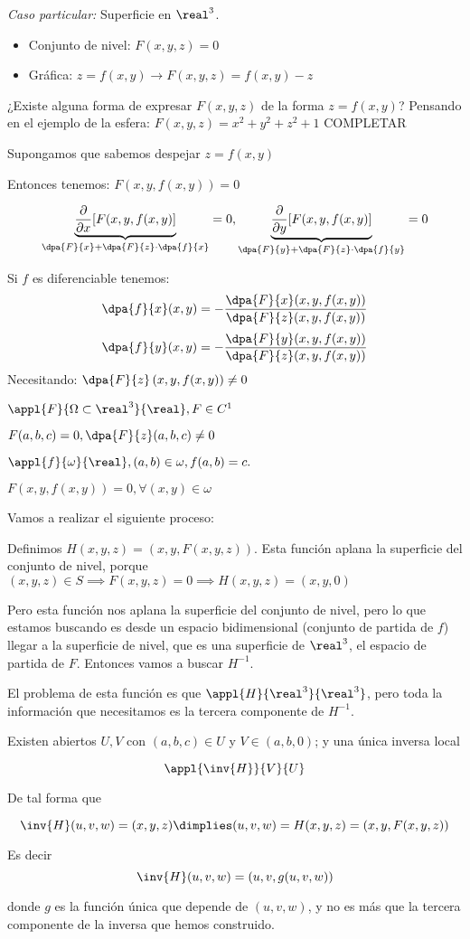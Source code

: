 \documentclass{apuntes}
\begin{document}
\emph{Caso particular:} Superficie en $\real^3$.
\begin{itemize}
 \item Conjunto de nivel: $F(x,y,z) = 0$
 \item Gráfica: $z=f(x,y) \rightarrow F(x,y,z) = f(x,y)-z$
\end{itemize}
¿Existe alguna forma de expresar $F(x,y,z)$ de la forma $z=f(x,y)$? Pensando en el ejemplo de la esfera: $F(x,y,z) = x^2+y^2+z^2+1$
COMPLETAR

Supongamos que sabemos despejar $z=f(x,y)$

Entonces tenemos: $F(x,y,f(x,y)) = 0$

$$\underbrace{\frac{\partial}{\partial x} [F(x,y,f(x,y)]}_{\dpa{F}{x} + \dpa{F}{z}\cdot\dpa{f}{x}}=0, \underbrace{\frac{\partial}{\partial y} [F(x,y,f(x,y)]}_{\dpa{F}{y} + \dpa{F}{z}\cdot\dpa{f}{y}} = 0$$

Si $f$ es diferenciable tenemos:
$$\dpa{f}{x}(x,y) = - \frac{\dpa{F}{x}(x,y,f(x,y))}{\dpa{F}{z}(x,y,f(x,y))}$$
$$\dpa{f}{y}(x,y) = - \frac{\dpa{F}{y}(x,y,f(x,y))}{\dpa{F}{z}(x,y,f(x,y))}$$
Necesitando: $\displaystyle\dpa{F}{z}\left(x,y,f(x,y)\right) \neq 0$

\begin{theorem}
$\appl{F}{\Omega\subset\real^3}{\real}, F\in C^1$

$F(a,b,c) = 0, \dpa{F}{z}(a,b,c)\neq 0$

$\appl{f}{\omega}{\real}, (a,b)\in \omega, f(a,b) = c.$

$F(x,y,f(x,y)) = 0, \forall(x,y)\in \omega$

\end{theorem}

Vamos a realizar el siguiente proceso:

Definimos $H(x,y,z) = (x,y,F(x,y,z))$. Esta función aplana la superficie del conjunto de nivel, porque $(x,y,z) \in S \implies F(x,y,z)=0 \implies H(x,y,z) = (x,y,0)$

Pero esta función nos aplana la superficie del conjunto de nivel, pero lo que estamos buscando es desde un espacio bidimensional (conjunto de partida de $f$) llegar a la superficie de nivel, que es una superficie de $\real^3$, el espacio de partida de $F$. Entonces vamos a buscar $H^{-1}$.

El problema de esta función es que $\appl{H}{\real^3}{\real^3}$, pero toda la información que necesitamos es la tercera componente de $H^{-1}$.
\begin{theorem} Existen abiertos $U, V$ con $(a,b,c) \in U$ y  $V\in (a,b,0)$; y una única inversa local 

\[ \appl{\inv{H}}{V}{U} \]

De tal forma que 

\[ \inv{H}(u,v,w) = (x,y,z) \dimplies (u,v,w) = H(x,y,z) = (x,y,F(x,y,z)) \]

Es decir \[ \inv{H} (u,v,w) = (u,v,g(u,v,w)) \]

donde $g$ es la función única que depende de $(u,v,	w)$, y no es más que la tercera componente de la inversa que hemos construido.
\end{theorem}
\end{document}
